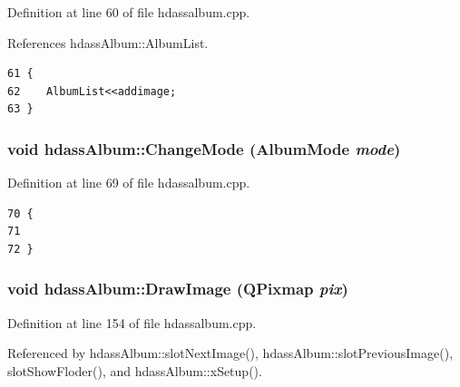 Definition at line 60 of file hdassalbum.cpp.

References hdass\-Album::Album\-List.



\footnotesize\begin{verbatim}61 {
62    AlbumList<<addimage;
63 }
\end{verbatim}\normalsize 
{}
\subsubsection{\setlength{\rightskip}{0pt plus 5cm}void hdass\-Album::Change\-Mode ({\bf Album\-Mode} {\em mode})\hspace{0.3cm}{\tt  [slot, inherited]}}\label{classhdassAlbum_ImageDetiali3}




Definition at line 69 of file hdassalbum.cpp.



\footnotesize\begin{verbatim}70 {
71 
72 }
\end{verbatim}\normalsize 
{}
\subsubsection{\setlength{\rightskip}{0pt plus 5cm}void hdass\-Album::Draw\-Image (QPixmap {\em pix})\hspace{0.3cm}{\tt  [inherited]}}\label{classhdassAlbum_ImageDetiala4}




Definition at line 154 of file hdassalbum.cpp.

Referenced by hdass\-Album::slot\-Next\-Image(), hdass\-Album::slot\-Previous\-Image(), slot\-Show\-Floder(), and hdass\-Album::x\-Setup().




